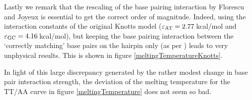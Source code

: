 Lastly we remark that the rescaling of the base pairing interaction by Florescu and Joyeux is essential to get the correct order of magnitude.
Indeed, using the interaction constants of the original Knotts model ($\varepsilon_\text{AT} = 2.77$\,kcal/mol and $\varepsilon_\text{GC} = 4.16$\,kcal/mol), but keeping the base pairing interaction between the `correctly matching' base pairs on the hairpin only (as per \cite{florescu2011thermal}) leads to very unphysical results. This is shown in figure \ref{meltingTemperatureKnotts}. 

In light of this large discrepancy generated by the rather modest change in base pair interaction strength, the deviation of the melting temperature for the TT/AA curve in figure \ref{meltingTemperature} does not seem so bad.


